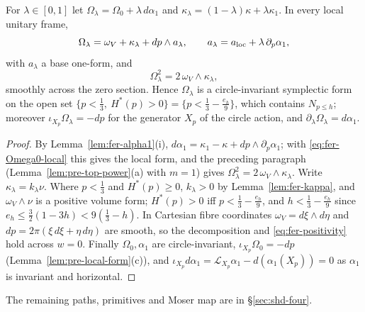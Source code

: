 \begin{lemma}[Positivity]\label{lem:fer-positivity}
For $\lambda\in[0,1]$ let $\Omega_\lambda=\Omega_0+\lambda\,d\alpha_1$ and $\kappa_\lambda=(1-\lambda)\kappa+\lambda\kappa_1$. In every local unitary
frame,
\[
 \Omega_\lambda=\omega_V+\kappa_\lambda+dp\wedge a_\lambda,\qquad a_\lambda=a_{\rm loc}+\lambda\,\partial_p\alpha_1,
\]
with $a_\lambda$ a base one-form, and
\begin{equation}\label{eq:fer-positivity}
 \Omega_\lambda^2=2\,\omega_V\wedge\kappa_\lambda ,
\end{equation}
smoothly across the zero section. Hence $\Omega_\lambda$ is a circle-invariant symplectic form on the open set
$\{p<\frac13,\ H^*(p)>0\}=\{p<\frac13-\frac{e_h}9\}$, which contains $N_{p\le h}$; moreover $\iota_{X_p}\Omega_\lambda=-dp$ for the
generator $X_p$ of the circle action, and $\partial_\lambda\Omega_\lambda=d\alpha_1$.
\end{lemma}

\begin{proof}
By Lemma~\ref{lem:fer-alpha1}(i), $d\alpha_1=\kappa_1-\kappa+dp\wedge\partial_p\alpha_1$; with \eqref{eq:fer-Omega0-local} this gives the local form, and the preceding paragraph (Lemma~\ref{lem:pre-top-power}(a) with $m=1$) gives $\Omega_\lambda^2=2\,\omega_V\wedge\kappa_\lambda$. Write $\kappa_\lambda=k_\lambda\nu$. Where $p<\frac13$ and $H^*(p)\ge0$, $k_\lambda>0$ by Lemma~\ref{lem:fer-kappa}, and $\omega_V\wedge\nu$ is a positive volume form; $H^*(p)>0$ iff $p<\frac13-\frac{e_h}9$, and $h<\frac13-\frac{e_h}9$ since $e_h\le\frac32(1-3h)<9(\frac13-h)$. In Cartesian fibre coordinates $\omega_V=d\xi\wedge d\eta$ and $dp=2\pi(\xi\,d\xi+\eta\,d\eta)$ are smooth, so the decomposition and \eqref{eq:fer-positivity} hold across $w=0$. Finally $\Omega_0,\alpha_1$ are circle-invariant, $\iota_{X_p}\Omega_0=-dp$ (Lemma~\ref{lem:pre-local-form}(c)), and $\iota_{X_p}d\alpha_1=\mathcal L_{X_p}\alpha_1-d(\alpha_1(X_p))=0$ as $\alpha_1$ is invariant and horizontal.
\end{proof}

The remaining paths, primitives and Moser map are in \S\ref{sec:shd-four}.

